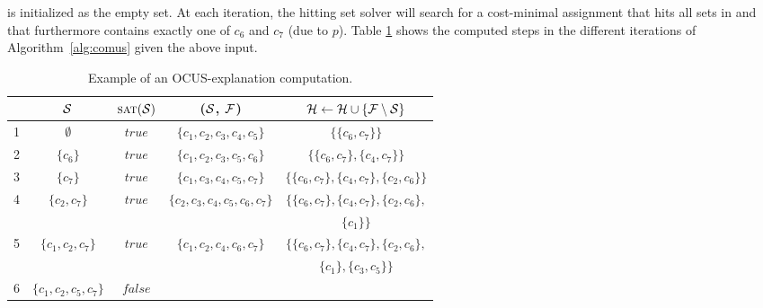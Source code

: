 \begin{example}
	 
\setstohit is initialized as the empty set. At each iteration, the hitting set solver will search for a cost-minimal assignment that hits all sets in \setstohit and that furthermore contains exactly one of $c_6$ and $c_7$ (due to $p$).
	Table \ref{tab:explanation-steps-expanded} shows the computed steps in the different iterations of Algorithm~\ref{alg:comus} given the above input.
\begin{table}[!t]
	\centering
	\begin{adjustbox}{max width=\columnwidth}
			\begin{tabular}{lcccc} 
				&$\mathcal{S}$ & $\textsc{sat}(\mathcal{S})$ & \grow($\mathcal{S}$, $\mathcal{F} $) & $\mathcal{H}  \gets \mathcal{H}  \cup \{  \mathcal{F}  \setminus \mathcal{S}\}$\\ 
				\toprule[2pt]
				1 &$ \emptyset $ & $\mathit{true}$ & $\{c_1, c_2, c_3, c_4, c_5\}$ & $\{ \{c_6, c_7\}\}$   \\
				\midrule	
				2 &$\{c_6\}$ & $\mathit{true}$ & $\{c_1, c_2, c_3, c_5, c_6\}$ & $\{ \{c_6, c_7\}, \{c_4, c_7\}\}$  \\  
				\midrule
				3 &$\{c_7\}$ & $\mathit{true}$ & $\{c_1, c_3, c_4, c_5, c_7\}$ & $\{\{c_6, c_7\}, \{c_4, c_7\}, \{c_2, c_6\}\}$  \\
				\midrule
				\multirow{2}{*}{4}& \multirow{2}{*}{$\{c_2, c_7\}$}  & \multirow{2}{*}{$\mathit{true}$} & \multirow{2}{*}{$\{c_2, c_3, c_4, c_5, c_6, c_7 \}$ } & $\{\{c_6, c_7\}, \{c_4, c_7\}, \{c_2, c_6\}, $  \\ 
				&   & &   & $ \{c_1\}\}$  \\
				\midrule
				\multirow{2}{*}{5}& \multirow{2}{*}{$\{c_1, c_2, c_7\}$}  & \multirow{2}{*}{$\mathit{true}$} & \multirow{2}{*}{$\{c_1, c_2, c_4, c_6, c_7 \}$ } & $\{\{c_6, c_7\}, \{c_4, c_7\}, \{c_2, c_6\}, $  \\ 
				&   & &   & $ \{c_1\}, \{c_3, c_5\}\}$  \\
				\midrule
				6&  $\{ c_1, c_2, c_5, c_7 \}$ & $\mathit{false}$ & & \\
			\end{tabular}
	\end{adjustbox}
	\caption{Example of an OCUS-explanation computation.}
	\label{tab:explanation-steps-expanded}
\end{table}
\end{example}

